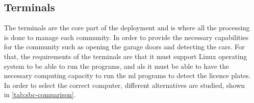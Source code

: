 \subsection{Terminals}\label{subsec:design_terminal}

The terminals are the core part of the deployment and is where all the processing is done to manage each community. In order to provide the necessary capabilities for the community such as opening the garage doors and detecting the cars. For that, the requirements of the terminals are that it must support Linux operating system to be able to run the programs, and als it must be able to have the necessary computing capacity to run the \gls{ml} programs to detect the licence plates. In order to select the correct computer, different alternatives are studied, shown in \cref{tab:sbc-comparison}.

